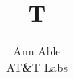 \documentclass{article}
\newcommand{\amp}{\textbf{\&}}
\begin{document}
\title{T}
\author{Ann Able\\ AT\amp T Labs}
\maketitle
\end{document}
